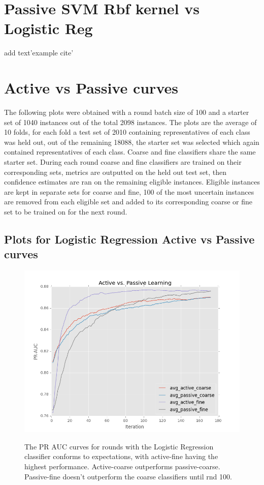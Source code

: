 \documentclass[ms]{nuthesis}
\begin{document}
\section{Passive SVM Rbf kernel vs Logistic Reg}
add text'example cite'\cite{Merialdo2001}


\section{Active vs Passive curves}
\par The following plots were obtained with a round batch size of 100
and a starter set of 1040 instances out of the total 2098 instances.
The plots are the average of 10 folds, for each fold a test set of 2010
containing representatives of each class was held out, out of the remaining
18088, the starter set was selected which again contained representatives of
each class. Coarse and fine classifiers share the same starter set. During
 each round coarse and fine classifiers are trained on their corresponding
 sets, metrics are outputted on the held out test set, then confidence estimates
 are ran on the remaining eligible instances. Eligible instances are kept in
 separate sets for coarse and fine, 100 of the most uncertain instances are removed
 from each eligible set and added to its corresponding coarse or fine set to be
 trained on for the next round.


\FloatBarrier
\subsection{Plots for Logistic Regression Active vs Passive curves}
\begin{figure}[!htb]
	\centering
    \includegraphics[width=1.0\columnwidth]{fig/ActiveVsPassivePRLR}
    \label{fig:ActiveVsPassivePRLR}
    \caption{The PR AUC curves for rounds with the Logistic
Regression classifier conforms to expectations, with active-fine having
the highest performance. Active-coarse outperforms passive-coarse. Passive-fine
doesn't outperform the coarse classifiers until rnd 100. }
\end{figure}
\FloatBarrier
\end{document}
